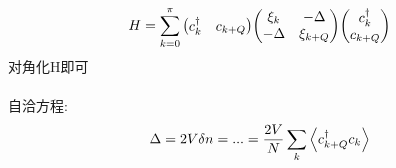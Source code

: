 \documentclass[a4paper]{article}
\numberwithin{equation}{section}
\begin{document}
\begin{equation}\label{key}
H = \sum_{k=0}^\pi \mqty(c_k^\dagger & c_{k+Q}) 
\mqty(\xi_k & -\Delta \\ -\Delta & \xi_{k+Q}) \mqty(c_k^\dagger \\ c_{k+Q}) 
\end{equation}
对角化H即可\\
~\\
自洽方程:
\begin{equation}\label{key}
\Delta = 2V\delta n = ... = \dfrac{2V}{N} \sum_k \ev{c_{k+Q}^\dagger c_k }
\end{equation}
\end{document}
